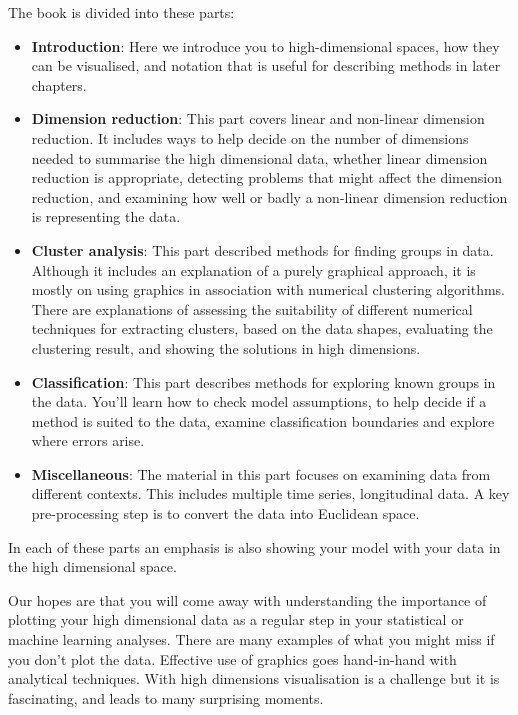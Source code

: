 \documentclass[
  letterpaper,
]{krantz}
\providecommand{\tightlist}{%
  \setlength{\itemsep}{0pt}\setlength{\parskip}{0pt}}\usepackage{longtable,booktabs,array}
\begin{document}

The book is divided into these parts:

\begin{itemize}
\tightlist
\item
  \textbf{Introduction}: Here we introduce you to high-dimensional
  spaces, how they can be visualised, and notation that is useful for
  describing methods in later chapters.\\
\item
  \textbf{Dimension reduction}: This part covers linear and non-linear
  dimension reduction. It includes ways to help decide on the number of
  dimensions needed to summarise the high dimensional data, whether
  linear dimension reduction is appropriate, detecting problems that
  might affect the dimension reduction, and examining how well or badly
  a non-linear dimension reduction is representing the data.
\item
  \textbf{Cluster analysis}: This part described methods for finding
  groups in data. Although it includes an explanation of a purely
  graphical approach, it is mostly on using graphics in association with
  numerical clustering algorithms. There are explanations of assessing
  the suitability of different numerical techniques for extracting
  clusters, based on the data shapes, evaluating the clustering result,
  and showing the solutions in high dimensions.
\item
  \textbf{Classification}: This part describes methods for exploring
  known groups in the data. You'll learn how to check model assumptions,
  to help decide if a method is suited to the data, examine
  classification boundaries and explore where errors arise.
\item
  \textbf{Miscellaneous}: The material in this part focuses on examining
  data from different contexts. This includes multiple time series,
  longitudinal data. A key pre-processing step is to convert the data
  into Euclidean space.
\end{itemize}

In each of these parts an emphasis is also showing your model with your
data in the high dimensional space.

Our hopes are that you will come away with understanding the importance
of plotting your high dimensional data as a regular step in your
statistical or machine learning analyses. There are many examples of
what you might miss if you don't plot the data. Effective use of
graphics goes hand-in-hand with analytical techniques. With high
dimensions visualisation is a challenge but it is fascinating, and leads
to many surprising moments.
\end{document}

